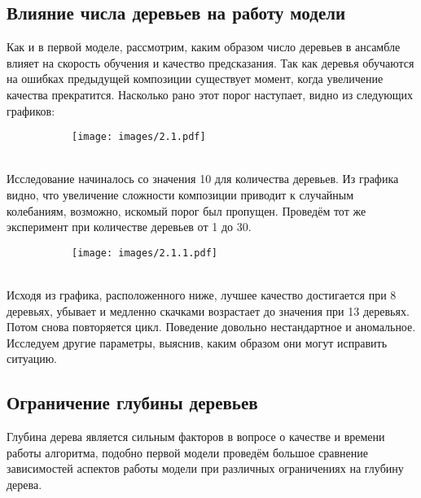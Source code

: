 \documentclass[a4paper,14pt]{article}
\begin{document}
\subsection{Влияние числа деревьев на работу модели}
Как и в первой моделе, рассмотрим, каким образом число деревьев в ансамбле влияет на скорость обучения и качество предсказания. Так как деревья обучаются на ошибках предыдущей композиции существует момент, когда увеличение качества прекратится. Насколько рано этот порог наступает, видно из следующих графиков:\\

\begin{figure}[h!]
                \centering
                \begin{subfigure}[b]{1.0\textwidth}
                    \texttt{[image: images/2.1.pdf]}
                \end{subfigure}
            \end{figure} \\

Исследование начиналось со значения 10 для количества деревьев. Из графика видно, что увеличение сложности композиции приводит к случайным колебаниям, возможно, искомый порог был пропущен. Проведём тот же эксперимент при количестве деревьев от 1 до 30.

\begin{figure}[h!]
                \centering
                \begin{subfigure}[b]{1.0\textwidth}
                    \texttt{[image: images/2.1.1.pdf]}
                \end{subfigure}
            \end{figure} \\

Исходя из графика, расположенного ниже, лучшее качество достигается при 8 деревьях, убывает и медленно скачками возрастает до значения при 13 деревьях. Потом снова повторяется цикл. Поведение довольно нестандартное и аномальное. Исследуем другие параметры, выяснив, каким образом они могут исправить ситуацию.

\newpage
\subsection{Ограничение глубины деревьев}
Глубина дерева является сильным факторов в вопросе о качестве и времени работы алгоритма, подобно первой модели проведём большое сравнение зависимостей аспектов работы модели при различных ограничениях на глубину дерева.\\
\end{document}
